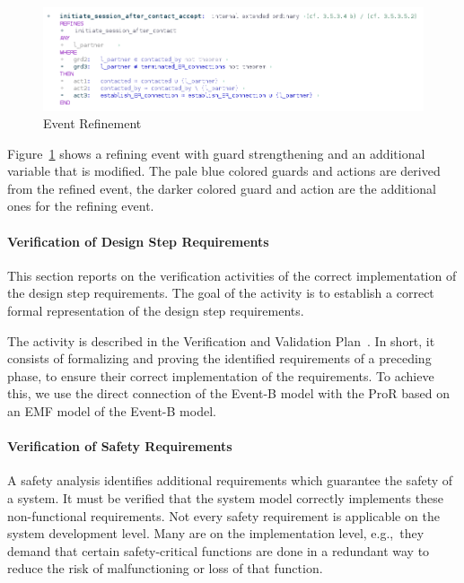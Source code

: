 \begin{figure}[ht]
  \centering
  \includegraphics[width=.9\textwidth]{figures/EventRefine}
  \caption{Event Refinement}
  \label{fig:event-refine}
\end{figure}

Figure~\ref{fig:event-refine} shows a refining event with guard strengthening
and an additional variable that is modified. The pale blue colored guards and
actions are derived from the refined event, the darker colored guard and action
are the additional ones for the refining event.


\paragraph{Verification of Design Step Requirements}
\label{sec:verif-design-step}

This section reports on the verification activities of the correct
implementation of the design step requirements. The goal of the activity is to
establish a correct formal representation of the design step requirements.

The activity is described in the Verification and Validation
Plan~\cite{vnvplan}.  In short, it consists of formalizing and proving the
identified requirements of a preceding phase, to ensure their correct
implementation of the requirements. To achieve this, we use the direct
connection of the Event-B model with the ProR based on an EMF model of the
Event-B model.


\paragraph{Verification of Safety Requirements}
\label{sec:verif-safety-requ}

A safety analysis identifies additional requirements which guarantee the safety
of a system. It must be verified that the system model correctly implements
these non-functional requirements. Not every safety requirement is applicable on
the system development level. Many are on the implementation level, e.g.,\ they
demand that certain safety-critical functions are done in a redundant way to
reduce the risk of malfunctioning or loss of that function.


